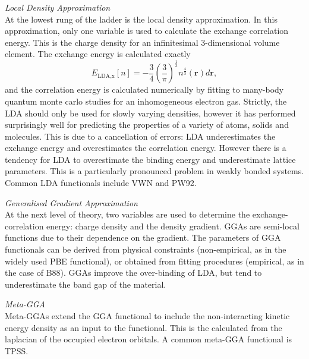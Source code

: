 \textit{Local Density Approximation} \\
At the lowest rung of the ladder is the local density approximation. In this approximation, only one variable is used to calculate the exchange correlation energy. This is the charge density for an infinitesimal 3-dimensional volume element. The exchange energy is calculated exactly
$$
E_{\textrm{LDA,x}}\left[n\right] = −\frac{3}{4}\left(\frac{3}{\pi}\right)^{\frac{1}{3}}n^{\frac{4}{3}}\left(\textbf{r}\right)d\textbf{r},
$$
and the correlation energy is calculated numerically by fitting to many-body quantum monte carlo studies for an inhomogeneous electron gas.%
Strictly, the LDA should only be used for slowly varying densities, however it has performed surprisingly well for predicting the properties of a variety of atoms, solids and molecules. This is due to a cancellation of errors: LDA underestimates the exchange energy and overestimates the correlation energy. However there is a tendency for LDA to overestimate the binding energy and underestimate lattice parameters. This is a particularly pronounced problem in weakly bonded systems. Common LDA functionals include VWN and PW92.

\textit{Generalised Gradient Approximation} \\
At the next level of theory, two variables are used to determine the exchange-correlation energy: charge density and the density gradient. GGAs are semi-local functions due to their dependence on the gradient. The parameters of GGA functionals can be derived from physical constraints (non-empirical, as in the widely used PBE functional), or obtained from fitting procedures (empirical, as in the case of B88). GGAs improve the over-binding of LDA, but tend to underestimate the band gap of the material.

\textit{Meta-GGA} \\
Meta-GGAs extend the GGA functional to include the non-interacting kinetic energy density as an input to the functional. This is the calculated from the laplacian of the occupied electron orbitals.
A common meta-GGA functional is TPSS.

